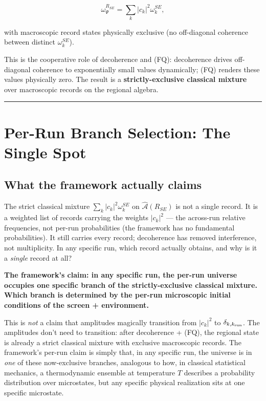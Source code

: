 \documentclass[11pt,a4paper]{article}
\begin{document}
\[
\omega_\Psi^{R_{SE}} = \sum_k |c_k|^2 \omega_k^{SE},
\]

with macroscopic record states physically exclusive (no off-diagonal coherence between distinct $\omega_k^{SE}$).

This is the cooperative role of decoherence and (FQ): decoherence drives off-diagonal coherence to exponentially small values dynamically; (FQ) renders these values physically zero. The result is a \textbf{strictly-exclusive classical mixture} over macroscopic records on the regional algebra.

\medskip\hrule\medskip

\section{Per-Run Branch Selection: The Single Spot}

\subsection{What the framework actually claims}

The strict classical mixture $\sum_k |c_k|^2 \omega_k^{SE}$ on $\hat{\mathcal{A}}(R_{SE})$ is not a single record. It is a weighted list of records carrying the weights $|c_k|^2$ — the across-run relative frequencies, not per-run probabilities (the framework has no fundamental probabilities). It still carries every record; decoherence has removed interference, not multiplicity. In any specific run, which record actually obtains, and why is it a \emph{single} record at all?

\textbf{The framework's claim: in any specific run, the per-run universe occupies one specific branch of the strictly-exclusive classical mixture. Which branch is determined by the per-run microscopic initial conditions of the screen + environment.}

This is \emph{not} a claim that amplitudes magically transition from $|c_k|^2$ to $\delta_{k,k_{\rm run}}$. The amplitudes don't need to transition: after decoherence + (FQ), the regional state is already a strict classical mixture with exclusive macroscopic records. The framework's per-run claim is simply that, in any specific run, the universe is in \emph{one} of these now-exclusive branches, analogous to how, in classical statistical mechanics, a thermodynamic ensemble at temperature $T$ describes a probability distribution over microstates, but any specific physical realization sits at one specific microstate.
\end{document}

